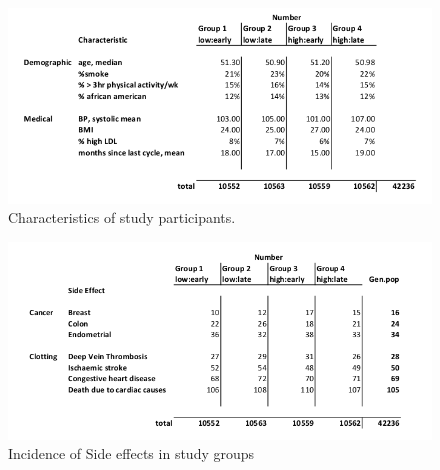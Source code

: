 \documentclass[11pt]{article}
\begin{document}
\begin{figure}[h!]
	\centering
	\includegraphics[scale=0.6]{table1.jpg}
	\caption{Characteristics of study participants.}
	\label{table1}
\end{figure}
 
\begin{figure}[h!]
	\centering
	\includegraphics[scale=0.7]{table2.jpg}
	\caption{Incidence of Side effects in study groups}
	\label{table2}
\end{figure}

\clearpage


\end{document}
